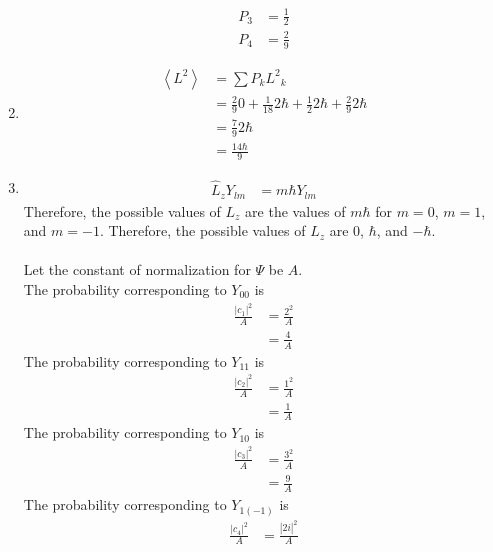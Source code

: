 \documentclass[fleqn, a4paper, 11pt, oneside]{amsart}
\theoremstyle{definition}
\theoremstyle{theorem}
\begin{document}
\begin{solution}
\begin{enumerate}[leftmargin=*]
\begin{align*}
				P_3 & = \frac{1}{2}  \\
				P_4 & = \frac{2}{9}
			\end{align*}
		\item
			\begin{align*}
				\left\langle L^2 \right\rangle & = \sum P_k {L^2}_k                                                                 \\
                                                               & = \frac{2}{9} 0 + \frac{1}{18} 2 \hbar + \frac{1}{2} 2 \hbar + \frac{2}{9} 2 \hbar \\
                                                               & = \frac{7}{9} 2 \hbar                                                              \\
                                                               & = \frac{14 \hbar}{9}
			\end{align*}
		\item
			\begin{align*}
				\hat{L}_z Y_{l m} & = m \hbar Y_{l m}
			\end{align*}
			Therefore, the possible values of $L_z$ are the values of $m \hbar$ for $m = 0$, $m = 1$, and $m = -1$.
			Therefore, the possible values of $L_z$ are $0$, $\hbar$, and $-\hbar$.\\
			~\\
			Let the constant of normalization for $\Psi$ be $A$.\\
			The probability corresponding to $Y_{0 0}$ is
			\begin{align*}
				\frac{|c_1|^2}{A} & = \frac{2^2}{A} \\
                                                  & = \frac{4}{A}
			\end{align*}
			The probability corresponding to $Y_{1 1}$ is
			\begin{align*}
				\frac{|c_2|^2}{A} & = \frac{1^2}{A} \\
                                                  & = \frac{1}{A}
			\end{align*}
			The probability corresponding to $Y_{1 0}$ is
			\begin{align*}
				\frac{|c_3|^2}{A} & = \frac{3^2}{A} \\
                                                  & = \frac{9}{A}
			\end{align*}
			The probability corresponding to $Y_{1 (-1)}$ is
			\begin{align*}
				\frac{|c_4|^2}{A} & = \frac{|2 i|^2}{A} \\

\end{align*}
\end{enumerate}
\end{solution}
\end{document}
